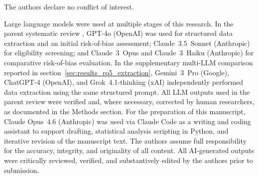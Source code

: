 \documentclass[etq]{acnsart}
\begin{document}
	\begin{conflictsofinterest}
		The authors declare no conflict of interest.
	\end{conflictsofinterest}
	
	
	\begin{aideclaration}
		Large language models were used at multiple stages of this research. In the parent systematic review \cite{KorniienkoSemerikov2024}, GPT-4o (OpenAI) was used for structured data extraction and an initial risk-of-bias assessment; Claude~3.5~Sonnet (Anthropic) for eligibility screening; and Claude~3~Opus and Claude~3~Haiku (Anthropic) for comparative risk-of-bias evaluation. In the supplementary multi-LLM comparison reported in section~\ref{sec:results_rq5_extraction}, Gemini~3~Pro (Google), ChatGPT-4 (OpenAI), and Grok~4.1-thinking (xAI) independently performed data extraction using the same structured prompt. All LLM outputs used in the parent review were verified and, where necessary, corrected by human researchers, as documented in the Methods section. For the preparation of this manuscript, Claude Opus~4.6 (Anthropic) was used via Claude Code as a writing and coding assistant to support drafting, statistical analysis scripting in Python, and iterative revision of the manuscript text. The authors assume full responsibility for the accuracy, integrity, and originality of all content. All AI-generated outputs were critically reviewed, verified, and substantively edited by the authors prior to submission.
	\end{aideclaration}
	
	
	
\end{document}
